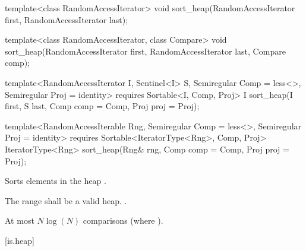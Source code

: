 %
\begin{removedblock}
\begin{itemdecl}
template<class RandomAccessIterator>
  void sort_heap(RandomAccessIterator first, RandomAccessIterator last);

template<class RandomAccessIterator, class Compare>
  void sort_heap(RandomAccessIterator first, RandomAccessIterator last,
                 Compare comp);
\end{itemdecl}
\end{removedblock}
\begin{addedblock}
\begin{itemdecl}
template<RandomAccessIterator I, Sentinel<I> S, Semiregular Comp = less<>,
    Semiregular Proj = identity>
  requires Sortable<I, Comp, Proj>
  I sort_heap(I first, S last, Comp comp = Comp{}, Proj proj = Proj{});

template<RandomAccessIterable Rng, Semiregular Comp = less<>, Semiregular Proj = identity>
  requires Sortable<IteratorType<Rng>, Comp, Proj>
  IteratorType<Rng>
    sort_heap(Rng& rng, Comp comp = Comp{}, Proj proj = Proj{});
\end{itemdecl}
\end{addedblock}

\begin{itemdescr}
\pnum
\effects
Sorts elements in the heap
.

\pnum
\requires The range  shall be a valid heap.
.

\begin{addedblock}
\pnum
\returns {}
\end{addedblock}

\pnum
\complexity
At most $N \log(N)$
comparisons (where
).
\end{itemdescr}

[is.heap]{}

